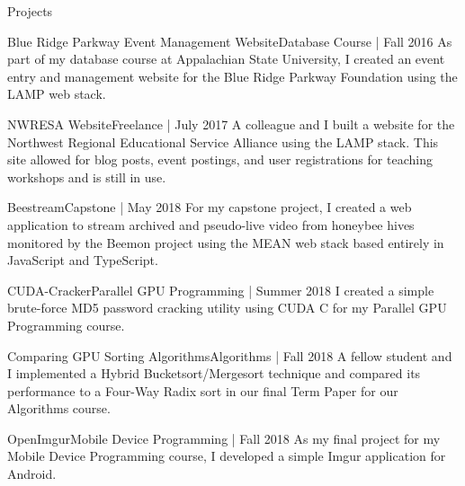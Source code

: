 \documentclass{resume} %
\begin{document}
\begin{rSection}{Projects}
\begin{rSubsection}{Blue Ridge Parkway Event Management Website}{Database Course | Fall 2016}{}{}{}
    As part of my database course at Appalachian State University, I created an event entry and management website for the Blue Ridge Parkway Foundation using the LAMP web stack. 
\end{rSubsection}
\begin{rSubsection}{NWRESA Website}{Freelance | July 2017}{}{}{}
    A colleague and I built a website for the Northwest Regional Educational Service Alliance using the LAMP stack.  This site allowed for blog posts, event postings, and user registrations for teaching workshops and is still in use. 
\end{rSubsection}
\begin{rSubsection}{Beestream}{Capstone | May 2018}{}{}{}
    For my capstone project, I created a web application to stream archived and pseudo-live video from honeybee hives monitored by the Beemon project using the MEAN web stack based entirely in JavaScript and TypeScript.  
\end{rSubsection}
\begin{rSubsection}{CUDA-Cracker}{Parallel GPU Programming | Summer 2018}{}{}{}
    I created a simple brute-force MD5 password cracking utility using CUDA C for my Parallel GPU Programming course.   
\end{rSubsection}
\begin{rSubsection}{Comparing GPU Sorting Algorithms}{Algorithms | Fall 2018}{}{}{}
    A fellow student and I implemented a Hybrid Bucketsort/Mergesort technique and compared its performance to a Four-Way Radix sort in our final Term Paper for our Algorithms course.   
\end{rSubsection}
\begin{rSubsection}{OpenImgur}{Mobile Device Programming | Fall 2018}{}{}{}
    As my final project for my Mobile Device Programming course, I developed a simple Imgur application for Android.  
\end{rSubsection}

\end{rSection}

\end{document}
